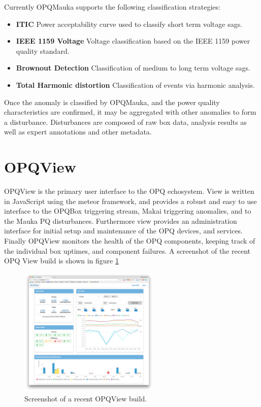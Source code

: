 Currently OPQMauka supports the following classification strategies: 
\begin{itemize}
	\item{\textbf{ITIC}} Power acceptability curve used to classify short term voltage sags.
	\item{\textbf{IEEE 1159 Voltage}} Voltage classification based on the IEEE 1159 power quality standard.
	\item{\textbf{Brownout Detection}} Classification of medium to long term voltage sags.
	\item{\textbf{Total Harmonic distortion}} Classification of events via harmonic analysis.
\end{itemize}

Once the anomaly is classified by OPQMauka, and the power quality characteristics are confirmed, it may be aggregated with other anomalies to form a disturbance. Disturbances are composed of raw box data, analysis results as well as expert annotations and other metadata.

\section{OPQView}

OPQView is the primary user interface to the OPQ echosystem. View is written in JavaScript using the meteor framework, and provides a robust and easy to use interface to the OPQBox triggering stream, Makai triggering anomalies, and to the Mauka PQ disturbances. Furthermore view provides an administration interface for initial setup and maintenance of the OPQ devices, and services. Finally OPQView monitors the health of the OPQ components, keeping track of the individual box uptimes, and component failures. A screenshot of the recent OPQ View build is shown in figure \ref{fig:9}

\begin{figure}[h]
  \begin{center}
  \includegraphics[width=0.6\textwidth]{img/opqview-landing-page.png}
  \end{center}
  \caption{Screenshot of a recent OPQView build.}
  \label{fig:9}
\end{figure}
